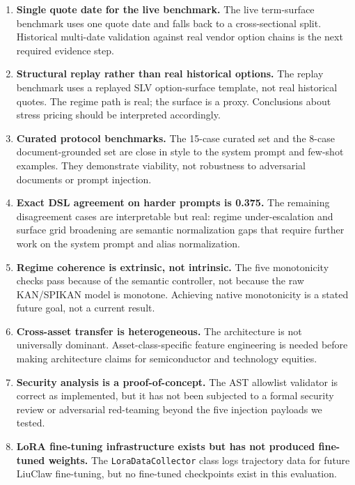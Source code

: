 \documentclass[11pt,a4paper]{article}
\begin{document}
\begin{enumerate}
  \item \textbf{Single quote date for the live benchmark.} The live term-surface benchmark uses one quote date and falls back to a cross-sectional split. Historical multi-date validation against real vendor option chains is the next required evidence step.

  \item \textbf{Structural replay rather than real historical options.} The replay benchmark uses a replayed SLV option-surface template, not real historical quotes. The regime path is real; the surface is a proxy. Conclusions about stress pricing should be interpreted accordingly.

  \item \textbf{Curated protocol benchmarks.} The 15-case curated set and the 8-case document-grounded set are close in style to the system prompt and few-shot examples. They demonstrate viability, not robustness to adversarial documents or prompt injection.

  \item \textbf{Exact DSL agreement on harder prompts is 0.375.} The remaining disagreement cases are interpretable but real: regime under-escalation and surface grid broadening are semantic normalization gaps that require further work on the system prompt and alias normalization.

  \item \textbf{Regime coherence is extrinsic, not intrinsic.} The five monotonicity checks pass because of the semantic controller, not because the raw KAN/SPIKAN model is monotone. Achieving native monotonicity is a stated future goal, not a current result.

  \item \textbf{Cross-asset transfer is heterogeneous.} The architecture is not universally dominant. Asset-class-specific feature engineering is needed before making architecture claims for semiconductor and technology equities.

  \item \textbf{Security analysis is a proof-of-concept.} The AST allowlist validator is correct as implemented, but it has not been subjected to a formal security review or adversarial red-teaming beyond the five injection payloads we tested.

  \item \textbf{LoRA fine-tuning infrastructure exists but has not produced fine-tuned weights.} The \texttt{LoraDataCollector} class logs trajectory data for future LiuClaw fine-tuning, but no fine-tuned checkpoints exist in this evaluation.
\end{enumerate}
\end{document}
